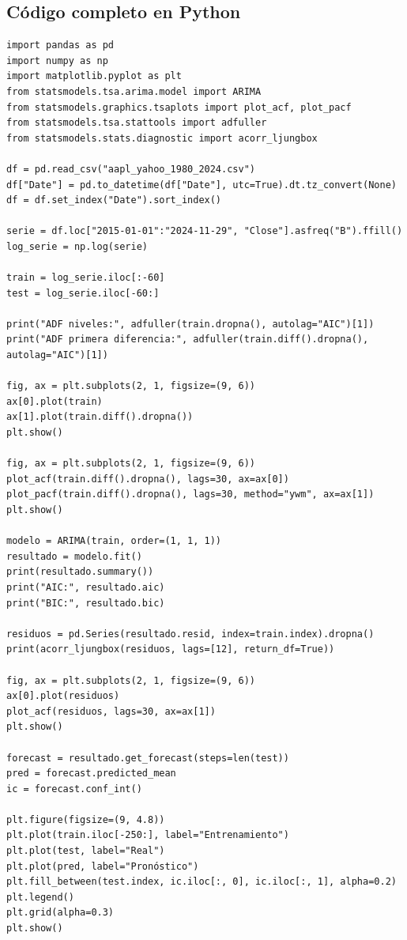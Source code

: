 \documentclass[12pt,a4paper]{article}
\begin{document}
\subsection{Código completo en Python}
\begin{lstlisting}[style=pythonstyle,caption={Ejemplo 1: ARIMA básico}]
import pandas as pd
import numpy as np
import matplotlib.pyplot as plt
from statsmodels.tsa.arima.model import ARIMA
from statsmodels.graphics.tsaplots import plot_acf, plot_pacf
from statsmodels.tsa.stattools import adfuller
from statsmodels.stats.diagnostic import acorr_ljungbox

df = pd.read_csv("aapl_yahoo_1980_2024.csv")
df["Date"] = pd.to_datetime(df["Date"], utc=True).dt.tz_convert(None)
df = df.set_index("Date").sort_index()

serie = df.loc["2015-01-01":"2024-11-29", "Close"].asfreq("B").ffill()
log_serie = np.log(serie)

train = log_serie.iloc[:-60]
test = log_serie.iloc[-60:]

print("ADF niveles:", adfuller(train.dropna(), autolag="AIC")[1])
print("ADF primera diferencia:", adfuller(train.diff().dropna(), autolag="AIC")[1])

fig, ax = plt.subplots(2, 1, figsize=(9, 6))
ax[0].plot(train)
ax[1].plot(train.diff().dropna())
plt.show()

fig, ax = plt.subplots(2, 1, figsize=(9, 6))
plot_acf(train.diff().dropna(), lags=30, ax=ax[0])
plot_pacf(train.diff().dropna(), lags=30, method="ywm", ax=ax[1])
plt.show()

modelo = ARIMA(train, order=(1, 1, 1))
resultado = modelo.fit()
print(resultado.summary())
print("AIC:", resultado.aic)
print("BIC:", resultado.bic)

residuos = pd.Series(resultado.resid, index=train.index).dropna()
print(acorr_ljungbox(residuos, lags=[12], return_df=True))

fig, ax = plt.subplots(2, 1, figsize=(9, 6))
ax[0].plot(residuos)
plot_acf(residuos, lags=30, ax=ax[1])
plt.show()

forecast = resultado.get_forecast(steps=len(test))
pred = forecast.predicted_mean
ic = forecast.conf_int()

plt.figure(figsize=(9, 4.8))
plt.plot(train.iloc[-250:], label="Entrenamiento")
plt.plot(test, label="Real")
plt.plot(pred, label="Pronóstico")
plt.fill_between(test.index, ic.iloc[:, 0], ic.iloc[:, 1], alpha=0.2)
plt.legend()
plt.grid(alpha=0.3)
plt.show()
\end{lstlisting}
\end{document}
